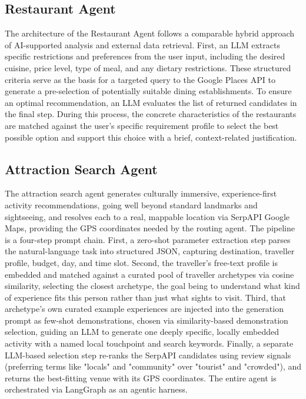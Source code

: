 \documentclass[a4paper,oneside,bibliography=totoc]{scrbook}
\begin{document}
\subsection{Restaurant Agent}
The architecture of the Restaurant Agent follows a comparable hybrid approach of AI-supported analysis and external data retrieval. First, an LLM extracts specific restrictions and preferences from the user input, including the desired cuisine, price level, type of meal, and any dietary restrictions. These structured criteria serve as the basis for a targeted query to the Google Places API to generate a pre-selection of potentially suitable dining establishments. To ensure an optimal recommendation, an LLM evaluates the list of returned candidates in the final step. During this process, the concrete characteristics of the restaurants are matched against the user's specific requirement profile to select the best possible option and support this choice with a brief, context-related justification.
\subsection{Attraction Search Agent }
The attraction search agent generates culturally immersive, experience-first activity recommendations, going well beyond standard landmarks and sightseeing, and resolves each to a real, mappable location via SerpAPI Google Maps, providing the GPS coordinates needed by the routing agent. The pipeline is a four-step prompt chain. First, a zero-shot parameter extraction step parses the natural-language task into structured JSON, capturing destination, traveller profile, budget, day, and time slot. Second, the traveller's free-text profile is embedded and matched against a curated pool of traveller archetypes via cosine similarity, selecting the closest archetype, the goal being to understand what kind of experience fits this person rather than just what sights to visit. Third, that archetype's own curated example experiences are injected into the generation prompt as few-shot demonstrations, chosen via similarity-based demonstration selection, guiding an LLM to generate one deeply specific, locally embedded activity with a named local touchpoint and search keywords. Finally, a separate LLM-based selection step re-ranks the SerpAPI candidates using review signals (preferring terms like "locals" and "community" over "tourist" and "crowded"), and returns the best-fitting venue with its GPS coordinates. The entire agent is orchestrated via LangGraph as an agentic harness.
\end{document}
